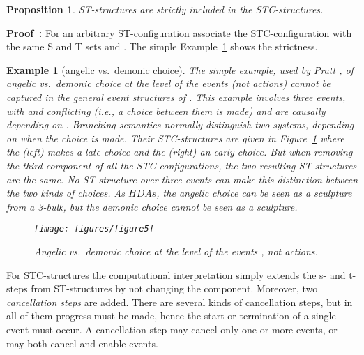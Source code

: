 \documentclass[submission,copyright,creativecommons]{eptcs}
\newtheorem{proposition}[theorem]{Proposition}
\newtheorem{example}[theorem]{Example}
\newenvironment{proof}[1][\!\!\,]{\vspace{1ex}\noindent\textbf{Proof #1: }}{\hfill\vspace{2ex}}
\newcommand\HDAs{\ensuremath{\mathit{HDAs}}}
\begin{document}
\begin{proposition}
ST-structures are strictly included in the STC-structures.
\end{proposition}

\begin{proof}
For an arbitrary ST-configuration associate the STC-configuration with the same S and T sets and .
The simple Example~\ref{ex_agelicdemon} shows the strictness.
\end{proof}


\begin{example}[angelic vs.\ demonic choice]\label{ex_agelicdemon}
The simple example, used by Pratt \cite[sec.3.3]{Pratt03trans_cancel}, of angelic vs.\ demonic choice at the level of the events (not actions) cannot be captured in the general event structures of \cite{GlabbeekP09configStruct}. 
This example involves three events, with  and  conflicting (i.e., a choice between them is made) and are causally depending on . Branching semantics normally distinguish two systems, depending on when the choice is made. Their STC-structures are given in Figure~\ref{fig_ex_angelicdemonic} where the (left) makes a late choice and the (right) an early choice. But when removing the third component  of all the STC-configurations, the two resulting ST-structures are the same. No ST-structure over three events can make this distinction between the two kinds of choices.
As \HDAs, the angelic choice can be seen as a sculpture from a 3-bulk, but the demonic choice cannot be seen as a sculpture.
\begin{figure}[tp]
  \begin{center}
    \hspace{-2ex}\texttt{[image: figures/figure5]}
  \end{center}
\caption{Angelic vs.\ demonic choice at the level of the events , not actions.}
\label{fig_ex_angelicdemonic}
\end{figure}
\end{example}



For STC-structures the computational interpretation simply extends the s- and t-steps from ST-structures by not changing the  component. Moreover, two \textit{cancellation steps} are added. There are several kinds of cancellation steps, but in all of them progress must be made, hence the start or termination of a single event must occur. A cancellation step may cancel only one or more events, or may both cancel and enable events.
\end{document}

